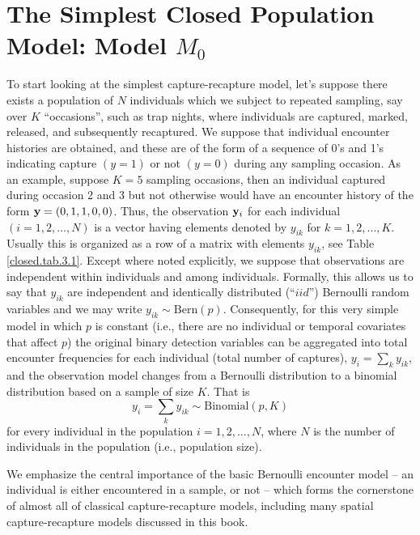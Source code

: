 \section{The Simplest Closed Population Model: Model $M_0$}

To start looking at the simplest capture-recapture model, let's suppose
there exists a population of $N$ individuals which we
subject to repeated sampling, say over $K$ ``occasions'', such as trap nights, where individuals
are captured, marked, released, and subsequently recaptured.  We suppose that
individual encounter histories are obtained, and these are of the form
of a sequence of 0's and 1's indicating capture $(y=1)$ or not $(y=0)$
during any sampling occasion.%
As an example, suppose
$K=5$ sampling occasions, then an individual captured during occasion 
2 and 3 but not otherwise would have an encounter history of the form
${\bf y}=(0,1,1,0,0)$. Thus, the observation ${\bf y}_{i}$ for each
individual $(i=1,2,\hdots,N)$ is a vector having elements denoted by $y_{ik}$ for
$k=1,2,\hdots,K$. Usually this is organized as a row of a matrix with
elements $y_{ik}$, see Table \ref{closed.tab.3.1}. Except where noted
explicitly, we suppose that observations are independent within
individuals and among individuals.  Formally, this allows us to say
that $y_{ik}$ are independent and identically distributed (``$iid$'')
Bernoulli random variables and we may write $y_{ik}
\sim \mbox{Bern}(p)$.  Consequently, for this very simple model in
which $p$ is constant (i.e., there are no individual or temporal
covariates that affect $p$) the original binary detection variables
can be aggregated into total encounter frequencies for each individual
(total number of captures), $y_{i} = \sum_{k} y_{ik}$, and the
observation model changes from a Bernoulli distribution to a
binomial distribution based on a sample of size $K$. That is
\[
y_{i}  = \sum_{k} y_{ik} \sim \mbox{Binomial}(p,K)
\]
for every individual in the population $i=1,2,\ldots,N$, where $N$ is
the number of individuals in the population (i.e., population size).

We emphasize the central importance of the basic Bernoulli encounter model
-- an individual is either encountered in a sample, or not --
 which forms
the cornerstone of almost all of classical
capture-recapture models, including many spatial capture-recapture
models discussed in this book.

